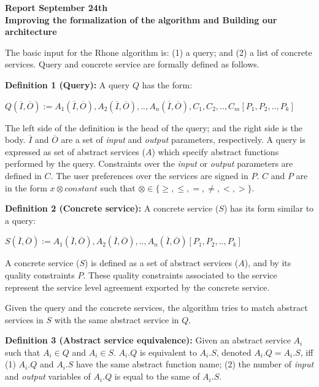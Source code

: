 \documentclass[12pt,a4paper,oneside]{article}
\begin{document}
\begin{center}
\textbf{\large{Report September 24th}} \\
\textbf{Improving the formalization of the algorithm and Building our architecture}
\end{center}

The basic input for the Rhone algorithm is: (1) a query; and (2) a list of concrete services.
Query and concrete service are formally defined as follows.

\noindent \textbf{Definition 1 (Query):} A query $Q$ has the form:
\begin{center}
$Q (\overline{I}, \overline{O}) := A_{1}(\overline{I}, \overline{O}), A_{2}(\overline{I}, \overline{O}), ..,  A_{n}(\overline{I}, \overline{O}),C_{1},C_{2}, .., C_{m}[P_{1},P_{2}, .., P_{k}]$
\end{center}  
The left side of the definition is the head of the query; and the right side is the body. 
$\overline{I}$ and $\overline{O}$ are a set of \textit{input} and \textit{output} parameters, respectively.
A query is expressed as set of abstract services ($A$) which specify abstract functions performed by the query.
Constraints over the \textit{input} or \textit{output} parameters are defined in $C$.
The user preferences over the services are signed in $P$. $C$ and $P$ are in the form $x \otimes constant$ such that $\otimes \in\lbrace \geq, \leq, =, \neq, <, >\rbrace$.

\noindent \textbf{Definition 2 (Concrete service):} A concrete service ($S$) has its form similar to a query:
\begin{center}
$S (\overline{I}, \overline{O}) := A_{1}(\overline{I}, \overline{O}), A_{2}(\overline{I}, \overline{O}), ..,  A_{n}(\overline{I}, \overline{O})[P_{1},P_{2}, .., P_{k}]$
\end{center}  
A concrete service ($S$) is defined as a set of abstract services ($A$), and by its quality constraints $P$. 
These quality constraints associated to the service represent the service level agreement exported by the concrete service.

Given the query and the concrete services, the algorithm tries to match abstract services in $S$ with the same abstract service in $Q$. 

\noindent \textbf{Definition 3 (Abstract service equivalence):} Given an abstract service $A_{i}$ such that $A_{i} \in Q$ and $A_{i} \in S$. $A_{i}.Q$ is equivalent to $A_{i}.S$, denoted $A_{i}.Q = A_{i}.S$, iff (1) $A_{i}.Q$ and $A_{i}.S$ have the same abstract function name; (2) the number of \textit{input} and \textit{output} variables of $A_{i}.Q$ is equal to the same of $A_{i}.S$.
\end{document}
